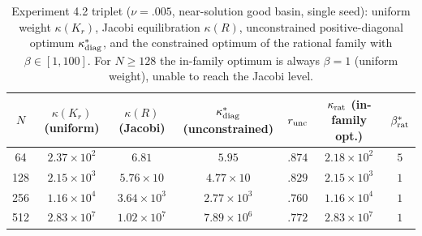 \documentclass[11pt]{article}
\numberwithin{equation}{section}
\begin{document}
\begin{table}[ht]\centering\small\renewcommand{\arraystretch}{1.2}
\begin{tabular}{ccccccc}
\toprule
$N$ & $\kappa(K_r)$ (uniform) & $\kappa(R)$ (Jacobi) & $\kappa^*_{\rm diag}$ (unconstrained) & $r_{\rm unc}$ & $\kappa_{\rm rat}$ (in-family opt.) & $\beta^*_{\rm rat}$\\
\midrule
64  & $2.37\times10^2$ & $6.81$ & $5.95$ & $.874$ & $2.18\times10^2$ & $5$\\
128 & $2.15\times10^3$ & $5.76\times10$ & $4.77\times10$ & $.829$ & $2.15\times10^3$ & $1$\\
256 & $1.16\times10^4$ & $3.64\times10^3$ & $2.77\times10^3$ & $.760$ & $1.16\times10^4$ & $1$\\
512 & $2.83\times10^7$ & $1.02\times10^7$ & $7.89\times10^6$ & $.772$ & $2.83\times10^7$ & $1$\\
\bottomrule
\end{tabular}
\caption{Experiment 4.2 triplet ($\nu=.005$, near-solution good basin, single seed): uniform weight $\kappa(K_r)$, Jacobi equilibration $\kappa(R)$, unconstrained positive-diagonal optimum $\kappa^*_{\rm diag}$, and the constrained optimum of the rational family with $\beta\in[1,100]$. For $N\ge128$ the in-family optimum is always $\beta=1$ (uniform weight), unable to reach the Jacobi level.}\label{tab:f1d-triplet}
\end{table}
\end{document}
